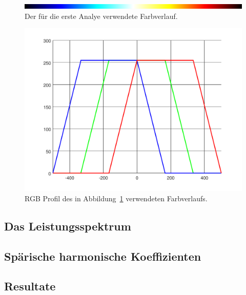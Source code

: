 \begin{figure}
	\centering
	\includegraphics[width=\linewidth]{cmb/converter/converter-function-strip.png}
	\caption{Der für die erste Analye verwendete Farbverlauf.}
	\label{fig:color-strip}
\end{figure}

\begin{figure}
	\centering
	\includegraphics[width=\linewidth]{cmb/converter/converter-function.pdf}
	\caption{RGB Profil des in Abbildung~\ref{fig:color-strip} 
		verwendeten Farbverlaufs.}
	\label{fig:color-strip-rgb}
\end{figure}


\subsection{Das Leistungsspektrum}


\subsection{Spärische harmonische Koeffizienten}

\subsection{Resultate}

